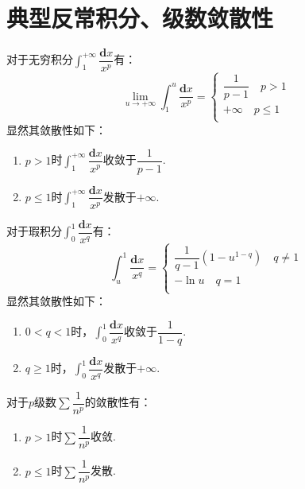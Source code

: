 \section{典型反常积分、级数敛散性}

\begin{proposition}[$p$积分]
	对于无穷积分$\int_{1}^{+\infty}\dfrac{\textbf{d}x}{x^p}$有：
	\begin{equation}
		\displaystyle\lim_{u \to +\infty}\int_{1}^{u}\dfrac{\textbf{d}x}{x^p} = \left\{
		\begin{aligned}
			\dfrac{1}{p-1} \quad p>1\\
			+\infty \quad p\leq 1\\
		\end{aligned}
		\right
		.
	\end{equation}
	显然其敛散性如下：
	\begin{enumerate}
		\item $p>1$时$\int_{1}^{+\infty}\dfrac{\textbf{d}x}{x^p}$收敛于$\dfrac{1}{p-1}$.
		\item $p\leq 1$时$\int_{1}^{+\infty}\dfrac{\textbf{d}x}{x^p}$发散于$+\infty$.
	\end{enumerate}
\end{proposition}


\begin{proposition}[$q$积分]
	对于瑕积分$\int_{0}^{1}\dfrac{\textbf{d}x}{x^q}$有：
	\begin{equation}
		\int_{u}^{1}\dfrac{\textbf{d}x}{x^q} = \left\{
		\begin{aligned}
			\dfrac{1}{q-1}(1-u^{1-q}) \quad q\neq 1\\
			-\ln{u} \quad q=1\\
		\end{aligned}
		\right
		.
	\end{equation}
	显然其敛散性如下：
	\begin{enumerate}
		\item $0<q<1$时，$\int_{0}^{1}\dfrac{\textbf{d}x}{x^q}$收敛于$\dfrac{1}{1-q}$.
		\item $q\geq 1$时，$\int_{0}^{1}\dfrac{\textbf{d}x}{x^q}$发散于$+\infty$.
	\end{enumerate}
\end{proposition}


\begin{corollary}[$p$级数]
	对于$p$级数$\sum \dfrac{1}{n^p}$的敛散性有：
	\begin{enumerate}
		\item $p>1$时$\sum \dfrac{1}{n^p}$收敛.
		\item $p\leq 1$时$\sum \dfrac{1}{n^p}$发散.
	\end{enumerate}
\end{corollary}

